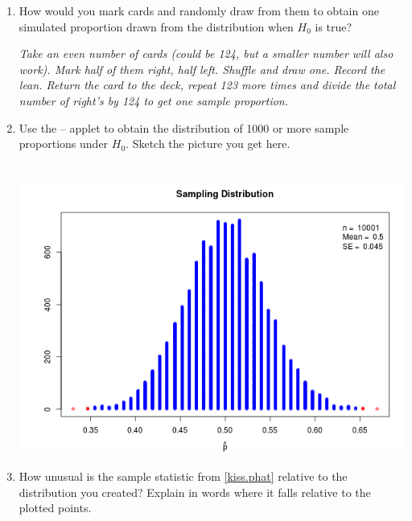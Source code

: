 \begin{enumerate}
\begin{enumerate}
\begin{enumerate}
\begin{key} 
{\it $p = .5$.  Half of all couples lean right when kissing.}
\end{key}
$H_a:$
\begin{students}
    \vspace{1cm}    \\
\end{students}
\begin{key} 
{\it $p \neq .5$.  The true proportion of couples leaning right when
  kissing is not one half.}
\end{key}
    \item How would you mark cards and randomly draw from them to
      obtain one simulated proportion drawn from the distribution when
      $H_0$ is true?
\begin{students}
    \vspace{3cm}    
\end{students}
\begin{key} 
{\it Take an even number of cards (could be 124, but a
    smaller number will also work). Mark half of them right, half
    left. Shuffle and draw one. Record the lean. Return the card
    to the deck, repeat 123 more times and divide the total number of
    right's by 124 to get one sample proportion.}
\end{key}
    \item Use the   --  applet to obtain
      the distribution of 1000 or more sample proportions under $H_0$.
      Sketch the picture you get here.
\begin{students}
    \vspace{5cm}    
\end{students}
\begin{key}
\ \  \\ \includegraphics[width=.3\linewidth]{../plots/kissing-null.png}
\end{key}
  \item How unusual is the sample statistic from \ref{kiss.phat}
    relative to the distribution you created?  Explain in words where
    it falls relative to the plotted points.
\begin{students}
    \vspace{3cm}    
\end{students}


\end{enumerate}
\end{enumerate}
\end{enumerate}
